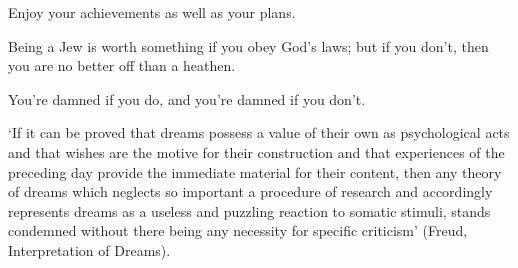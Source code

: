 \begin{enumerate}
	\begin{statement}{Enjoy your achievements as well as your plans.}
	\end{statement}

	\begin{statement}{Being a Jew is worth something if you obey God’s laws; but if you don’t, then you are no better off than a heathen.}
	\end{statement}

	\begin{statement}{You’re damned if you do, and you’re damned if you don’t.}
	\end{statement}

	\begin{statement}{‘If it can be proved that dreams possess a value of their own
			as psychological acts and that wishes are the motive for their construction
			and that experiences of the preceding day provide the immediate material for
			their content, then any theory of dreams which neglects so important a
			procedure of research and accordingly represents dreams as a useless and
			puzzling reaction to somatic stimuli, stands condemned without there being
			any necessity for specific criticism’ (Freud, Interpretation of Dreams).}
	\end{statement}

\end{enumerate}
% 
